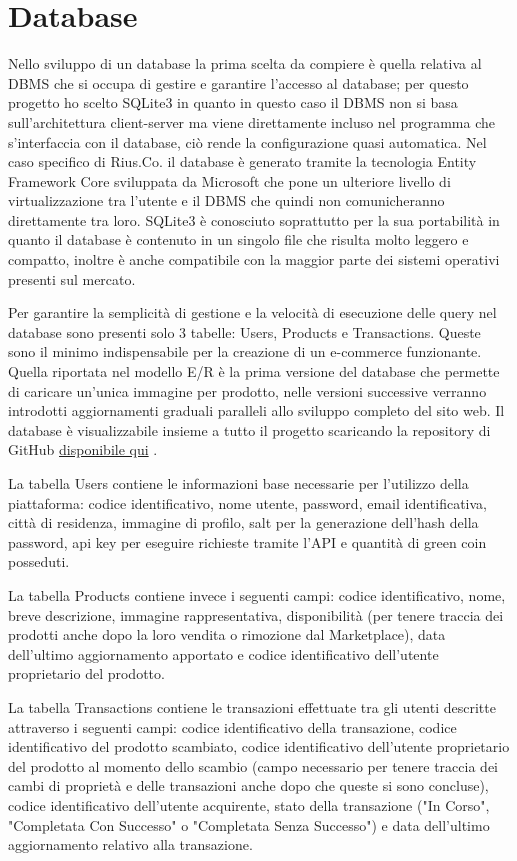\section{Database}
Nello sviluppo di un database la prima scelta da compiere è quella relativa al DBMS che si occupa di gestire e garantire l'accesso al database; per questo progetto ho scelto SQLite3 \cite{SQLite3} in quanto in questo caso il DBMS non si basa sull'architettura client-server ma viene direttamente incluso nel programma che s'interfaccia con il database, ciò rende la configurazione quasi automatica. Nel caso specifico di Rius.Co. il database è generato tramite la tecnologia Entity Framework Core sviluppata da Microsoft che pone un ulteriore livello di virtualizzazione tra l'utente e il DBMS che quindi non comunicheranno direttamente tra loro. SQLite3 è conosciuto soprattutto per la sua portabilità in quanto il database è contenuto in un singolo file che risulta molto leggero e compatto, inoltre è anche compatibile con la maggior parte dei sistemi operativi presenti sul mercato. 
\medskip

Per garantire la semplicità di gestione e la velocità di esecuzione delle query nel database sono presenti solo 3 tabelle: Users, Products e Transactions. Queste sono il minimo indispensabile per la creazione di un e-commerce funzionante. Quella riportata nel modello E/R è la prima versione del database che permette di caricare un'unica immagine per prodotto, nelle versioni successive verranno introdotti aggiornamenti graduali paralleli allo sviluppo completo del sito web. Il database è visualizzabile insieme a tutto il progetto scaricando la repository di GitHub \href{https://github.com/MauroPello/elaborato}{disponibile qui} \cite{GitHub}. 
\medskip

La tabella Users contiene le informazioni base necessarie per l'utilizzo della piattaforma: codice identificativo, nome utente, password, email identificativa, città di residenza, immagine di profilo, salt per la generazione dell'hash della password, api key per eseguire richieste tramite l'API e quantità di green coin posseduti. 
\medskip

La tabella Products contiene invece i seguenti campi: codice identificativo, nome, breve descrizione, immagine rappresentativa, disponibilità (per tenere traccia dei prodotti anche dopo la loro vendita o rimozione dal Marketplace), data dell'ultimo aggiornamento apportato e codice identificativo dell'utente proprietario del prodotto. 
\medskip

La tabella Transactions contiene le transazioni effettuate tra gli utenti descritte attraverso i seguenti campi: codice identificativo della transazione, codice identificativo del prodotto scambiato, codice identificativo dell'utente proprietario del prodotto al momento dello scambio (campo necessario per tenere traccia dei cambi di proprietà e delle transazioni anche dopo che queste si sono concluse), codice identificativo dell'utente acquirente, stato della transazione ("In Corso", "Completata Con Successo" o "Completata Senza Successo") e data dell'ultimo aggiornamento relativo alla transazione. 
